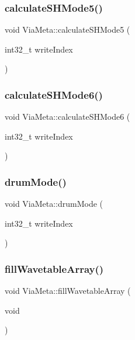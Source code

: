 \subsubsection{\texorpdfstring{calculate\+S\+H\+Mode5()}{calculateSHMode5()}}
{\footnotesize\ttfamily void Via\+Meta\+::calculate\+S\+H\+Mode5 (\begin{DoxyParamCaption}\item[{int32\+\_\+t}]{write\+Index }\end{DoxyParamCaption})}

\mbox{\label{class_via_meta_ab85c156e41e1382382c09b1bed76caab}} 
\subsubsection{\texorpdfstring{calculate\+S\+H\+Mode6()}{calculateSHMode6()}}
{\footnotesize\ttfamily void Via\+Meta\+::calculate\+S\+H\+Mode6 (\begin{DoxyParamCaption}\item[{int32\+\_\+t}]{write\+Index }\end{DoxyParamCaption})}

\mbox{\label{class_via_meta_a81c41ff6c7e3b4c0bb24a708755235fb}} 
\subsubsection{\texorpdfstring{drum\+Mode()}{drumMode()}}
{\footnotesize\ttfamily void Via\+Meta\+::drum\+Mode (\begin{DoxyParamCaption}\item[{int32\+\_\+t}]{write\+Index }\end{DoxyParamCaption})}

\mbox{\label{class_via_meta_a08af168b0e35016e949820875aa203ff}} 
\subsubsection{\texorpdfstring{fill\+Wavetable\+Array()}{fillWavetableArray()}}
{\footnotesize\ttfamily void Via\+Meta\+::fill\+Wavetable\+Array (\begin{DoxyParamCaption}\item[{void}]{ }\end{DoxyParamCaption})}

